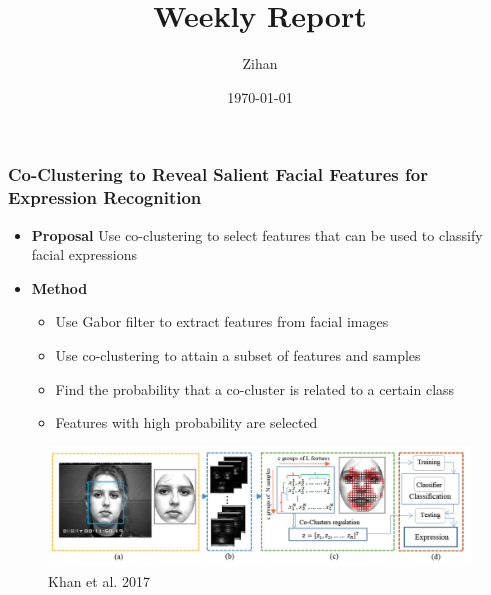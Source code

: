 \documentclass[11pt]{beamer}
\title{Weekly Report}
\author{Zihan}
\date{\today}
\begin{document}


\begin{frame}
    \frametitle{Co-Clustering to Reveal Salient Facial Features for Expression Recognition}
    \begin{itemize}
        \item \textbf{Proposal} Use co-clustering to select features that can be used to classify facial expressions
        \item \textbf{Method}
              \begin{itemize}
                  \item Use Gabor filter to extract features from facial images
                  \item Use co-clustering to attain a subset of features and samples
                  \item Find the probability that a co-cluster is related to a certain class
                  \item Features with high probability are selected
              \end{itemize}
    \end{itemize}
    \begin{figure}[htbp]
        \centering
        \includegraphics[width=\textwidth]{khan.png}
        \caption{Khan et al. 2017}
    \end{figure}
\end{frame}

\end{document}
